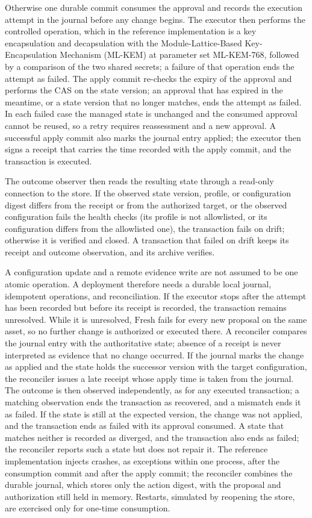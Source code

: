 \documentclass[journal]{IEEEtran}
\newcommand{\Fresh}{\mathrm{Fresh}}
\begin{document}
Otherwise one durable commit consumes the approval and records the execution attempt in the journal before any change begins. The executor then performs the controlled operation, which in the reference implementation is a key encapsulation and decapsulation with the Module-Lattice-Based Key-Encapsulation Mechanism (ML-KEM) at parameter set ML-KEM-768, followed by a comparison of the two shared secrets; a failure of that operation ends the attempt as failed. The apply commit re-checks the expiry of the approval and performs the CAS on the state version; an approval that has expired in the meantime, or a state version that no longer matches, ends the attempt as failed. In each failed case the managed state is unchanged and the consumed approval cannot be reused, so a retry requires reassessment and a new approval. A successful apply commit also marks the journal entry applied; the executor then signs a receipt that carries the time recorded with the apply commit, and the transaction is executed.

The outcome observer then reads the resulting state through a read-only connection to the store. If the observed state version, profile, or configuration digest differs from the receipt or from the authorized target, or the observed configuration fails the health checks (its profile is not allowlisted, or its configuration differs from the allowlisted one), the transaction fails on drift; otherwise it is verified and closed. A transaction that failed on drift keeps its receipt and outcome observation, and its archive verifies.

A configuration update and a remote evidence write are not assumed to be one atomic operation. A deployment therefore needs a durable local journal, idempotent operations, and reconciliation. If the executor stops after the attempt has been recorded but before its receipt is recorded, the transaction remains unresolved. While it is unresolved, $\Fresh$ fails for every new proposal on the same asset, so no further change is authorized or executed there. A reconciler compares the journal entry with the authoritative state; absence of a receipt is never interpreted as evidence that no change occurred. If the journal marks the change as applied and the state holds the successor version with the target configuration, the reconciler issues a late receipt whose apply time is taken from the journal. The outcome is then observed independently, as for any executed transaction; a matching observation ends the transaction as recovered, and a mismatch ends it as failed. If the state is still at the expected version, the change was not applied, and the transaction ends as failed with its approval consumed. A state that matches neither is recorded as diverged, and the transaction also ends as failed; the reconciler reports such a state but does not repair it. The reference implementation injects crashes, as exceptions within one process, after the consumption commit and after the apply commit; the reconciler combines the durable journal, which stores only the action digest, with the proposal and authorization still held in memory. Restarts, simulated by reopening the store, are exercised only for one-time consumption.
\end{document}
